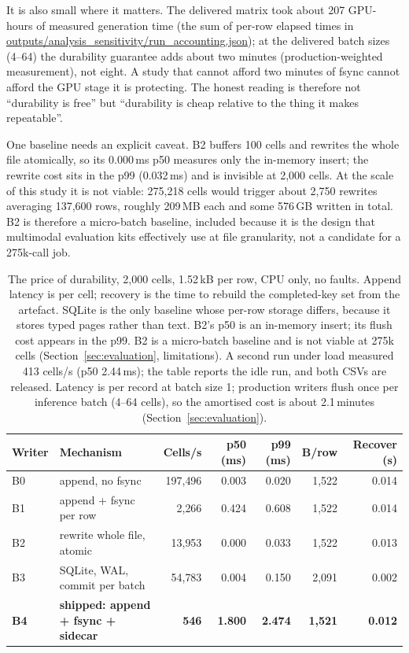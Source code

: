 It is also small where it matters. The delivered matrix took about 207 GPU-hours
of measured generation time (the sum of per-row elapsed times in
\url{outputs/analysis_sensitivity/run_accounting.json}); at the delivered batch
sizes (4--64) the durability guarantee adds about two minutes
(production-weighted measurement), not eight. A study that cannot afford two
minutes of fsync cannot afford the GPU stage it is protecting. The honest reading
is therefore not ``durability is free'' but ``durability is cheap relative to the
thing it makes repeatable''.

One baseline needs an explicit caveat. B2 buffers 100 cells and rewrites the whole
file atomically, so its 0.000\,ms p50 measures only the in-memory insert; the
rewrite cost sits in the p99 (0.032\,ms) and is invisible at 2{,}000 cells. At the
scale of this study it is not viable: 275,218 cells would trigger about 2{,}750
rewrites averaging 137{,}600 rows, roughly 209\,MB each and some 576\,GB written in
total. B2 is therefore a micro-batch baseline, included because it is the design
that multimodal evaluation kits effectively use at file granularity, not a
candidate for a 275k-call job.

\begin{table}[t]
\centering
\small
\caption{The price of durability, 2{,}000 cells, 1.52\,kB per row, CPU only, no
faults. Append latency is per cell; recovery is the time to rebuild the completed-key
set from the artefact. SQLite is the only baseline whose per-row storage differs,
because it stores typed pages rather than text. B2's p50 is an in-memory insert;
its flush cost appears in the p99. B2 is a micro-batch baseline and is not viable
at 275k cells (Section~\ref{sec:evaluation}, limitations). A second run under
load measured 413 cells/s (p50 2.44\,ms); the table reports the idle run, and both
CSVs are released. Latency is per record at batch size 1; production writers
flush once per inference batch (4--64 cells), so the amortised cost is about
2.1\,minutes (Section~\ref{sec:evaluation}).}
\label{tab:cost}
\begin{tabular}{llrrrrr}
\toprule
Writer & Mechanism & Cells/s & p50 (ms) & p99 (ms) & B/row & Recover (s) \\
\midrule
B0 & append, no fsync & 197{,}496 & 0.003 & 0.020 & 1{,}522 & 0.014 \\
B1 & append + fsync per row & 2{,}266 & 0.424 & 0.608 & 1{,}522 & 0.014 \\
B2 & rewrite whole file, atomic & 13{,}953 & 0.000 & 0.033 & 1{,}522 & 0.013 \\
B3 & SQLite, WAL, commit per batch & 54{,}783 & 0.004 & 0.150 & 2{,}091 & 0.002 \\
\textbf{B4} & \textbf{shipped: append + fsync + sidecar} & \textbf{546} & \textbf{1.800} & \textbf{2.474} & \textbf{1{,}521} & \textbf{0.012} \\
\bottomrule
\end{tabular}
\end{table}

